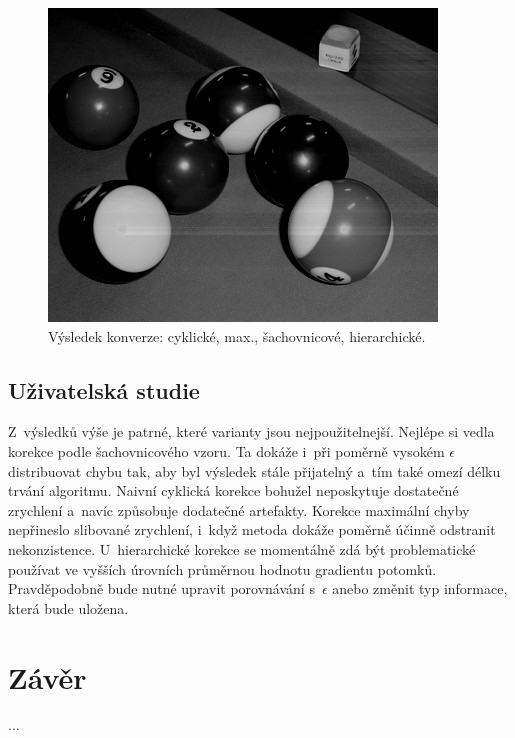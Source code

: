 \documentclass[11pt,a4paper,oneside]{article}
\begin{document}
\begin{figure}[!htbp]
		\includegraphics[scale=0.4]{fig/balls_hier.jpg}
		\caption{Výsledek konverze: cyklické, max.,
		         šachovnicové, hierarchické.}
		\label{fig:res_cyc}
	\end{figure}

	\subsection{Uživatelská studie}
	Z~výsledků výše je patrné, které varianty jsou nejpoužitelnejší.
	Nejlépe si vedla korekce podle šachovnicového vzoru. Ta dokáže i~při poměrně
	vysokém $\epsilon$ distribuovat chybu tak, aby byl výsledek stále přijatelný
	a~tím také omezí délku trvání algoritmu. Naivní cyklická korekce bohužel
	neposkytuje dostatečné zrychlení a~navíc způsobuje dodatečné artefakty. 
	Korekce maximální chyby nepřineslo slibované zrychlení, i~když metoda dokáže
	poměrně účinně odstranit nekonzistence. U~hierarchické korekce se momentálně
	zdá být problematické používat ve vyšších úrovních průměrnou hodnotu gradientu
	potomků. Pravděpodobně bude nutné upravit porovnávání s~$\epsilon$ anebo změnit typ informace,
	která bude uložena.

	\section{Závěr}
	...

	
	
\end{document}
